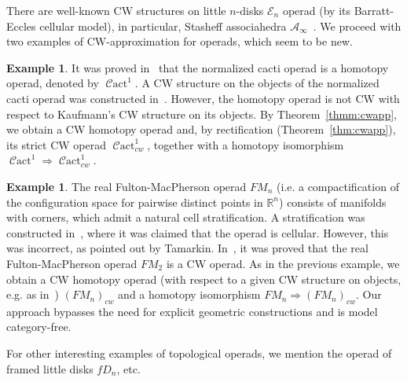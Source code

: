 \documentclass{amsart}
\theoremstyle{definition}
\newtheorem{example}[formula]{Example}
\theoremstyle{remark}
\newcommand{\R}{\mathbb R}
\DeclareMathOperator{\Cact}{\mathcal{C}act}
\begin{document}
	There are well-known CW structures on little $n$-disks $\mathcal{E}_{n}$ operad (by its Barratt-Eccles cellular model), in particular, Stasheff associahedra $\mathcal{A}_{\infty}$~\cite{be-fr-04}.
	We proceed with two examples of CW-approximation for operads, which seem to be new.
	
	\begin{example}
		It was proved in~\cite{clrrw-22} that the normalized cacti operad is a homotopy operad, denoted by $\Cact^{1}$.
		A CW structure on the objects of the normalized cacti operad was constructed in~\cite{ka-07}.
		However, the homotopy operad is not CW with respect to Kaufmann's CW structure on its objects.
		By Theorem~\ref{thmm:cwapp}, we obtain a CW homotopy operad and, by rectification (Theorem~\ref{thm:cwapp}), its strict CW  operad $\Cact^{1}_{cw}$, together with a homotopy isomorphism $\Cact^{1}\Rightarrow \Cact^{1}_{cw}$.
	\end{example}
	
	\begin{example}
		The real Fulton-MacPherson operad $FM_{n}$ (i.e. a compactification of the configuration space for pairwise distinct points in $\R^{n}$) consists of manifolds with corners, which admit a natural cell stratification.
		A stratification was constructed  in~\cite{ge-jo-94}, where it was claimed that the operad is cellular.
		However, this was incorrect, as pointed out by Tamarkin.
		In~\cite{sa-22}, it was proved that the real Fulton-MacPherson operad $FM_{2}$ is a CW operad.				
		As in the previous example, we obtain a CW homotopy operad (with respect to a given CW structure on objects, e.g. as in~\cite{ge-jo-94}) $(FM_{n})_{cw}$ and a homotopy isomorphism $FM_{n}\Rightarrow (FM_{n})_{cw}$.
		Our approach bypasses the need for explicit geometric constructions and is model category-free.
	\end{example}
	
	For other interesting examples of topological operads, we mention the operad of framed little disks $fD_{n}$, etc. 
	
\end{document}
